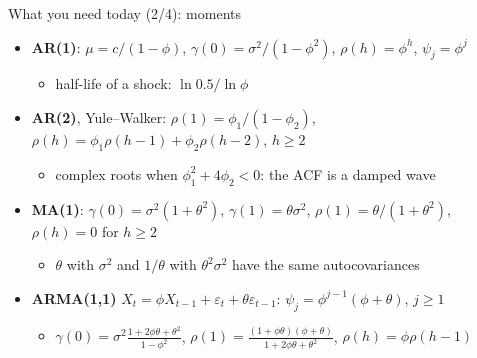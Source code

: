 \begin{frame}{What you need today (2/4): moments}
\itemsize{\small}
\begin{itemize}
    \item \textbf{AR(1)}: $\mu = c/(1 - \phi)$, $\gamma(0) = \sigma^2/(1 - \phi^2)$, $\rho(h) = \phi^h$, $\psi_j = \phi^j$
    \begin{itemize}
        \item half-life of a shock: $\ln 0.5/\ln\phi$
    \end{itemize}
    \item \textbf{AR(2)}, Yule--Walker: $\rho(1) = \phi_1/(1 - \phi_2)$, $\rho(h) = \phi_1\rho(h - 1) + \phi_2\rho(h - 2)$, $h \ge 2$
    \begin{itemize}
        \item complex roots when $\phi_1^2 + 4\phi_2 < 0$: the ACF is a damped wave
    \end{itemize}
    \item \textbf{MA(1)}: $\gamma(0) = \sigma^2(1 + \theta^2)$, $\gamma(1) = \theta\sigma^2$, $\rho(1) = \theta/(1 + \theta^2)$, $\rho(h) = 0$ for $h \ge 2$
    \begin{itemize}
        \item $\theta$ with $\sigma^2$ and $1/\theta$ with $\theta^2\sigma^2$ have the same autocovariances
    \end{itemize}
    \item \textbf{ARMA(1,1)} $X_t = \phi X_{t-1} + \varepsilon_t + \theta\varepsilon_{t-1}$: $\psi_j = \phi^{j-1}(\phi + \theta)$, $j \ge 1$
    \begin{itemize}
        \item $\gamma(0) = \sigma^2\frac{1 + 2\phi\theta + \theta^2}{1 - \phi^2}$, $\rho(1) = \frac{(1 + \phi\theta)(\phi + \theta)}{1 + 2\phi\theta + \theta^2}$, $\rho(h) = \phi\rho(h - 1)$
    \end{itemize}
\end{itemize}
\end{frame}

